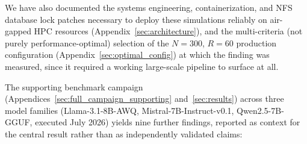 \documentclass[11pt,journal,onecolumn]{IEEEtran}
\begin{document}
We have also documented the systems engineering, containerization, and NFS database lock patches necessary to deploy these simulations reliably on air-gapped HPC resources (Appendix~\ref{sec:architecture}), and the multi-criteria (not purely performance-optimal) selection of the $N=300$, $R=60$ production configuration (Appendix~\ref{sec:optimal_config}) at which the finding was measured, since it required a working large-scale pipeline to surface at all.

The supporting benchmark campaign (Appendices~\ref{sec:full_campaign_supporting} and~\ref{sec:results}) across three model families (Llama-3.1-8B-AWQ, Mistral-7B-Instruct-v0.1, Qwen2.5-7B-GGUF, executed July 2026) yields nine further findings, reported as context for the central result rather than as independently validated claims:
\end{document}
